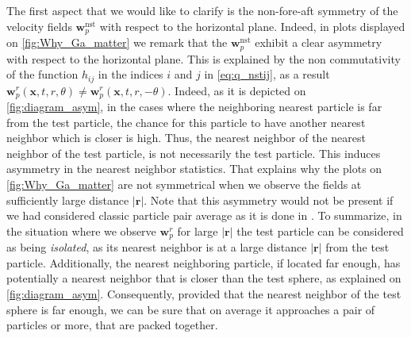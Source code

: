 The first aspect that we would like to clarify is the non-fore-aft symmetry of the velocity fields $\textbf{w}_p^\text{nst}$ with respect to the horizontal plane. 
Indeed, in plots displayed on \ref{fig:Why_Ga_matter} we remark that the $\textbf{w}_p^\text{nst}$ exhibit a clear asymmetry with respect to the horizontal plane.
This is explained by the non commutativity of the function $h_{ij}$ in the indices $i$ and $j$ in \ref{eq:q_nstij}, as a result $\textbf{w}_p^r(\textbf{x},t,r,\theta) \neq \textbf{w}_p^r(\textbf{x},t,r,-\theta)$. 
Indeed, as it is depicted on \ref{fig:diagram_asym}, in the cases where the neighboring nearest particle is far from the test particle, the chance for this particle to have another nearest neighbor which is closer is high. 
Thus, the nearest neighbor of the nearest neighbor of the test particle, is not necessarily the test particle. 
This induces asymmetry in the nearest neighbor statistics. 
That explains why the plots on \ref{fig:Why_Ga_matter} are not symmetrical when we observe the fields at sufficiently large distance $|\textbf{r}|$. 
Note that this asymmetry would not be present if we had considered classic particle pair average as it is done in \cite{shajahan2023inertial}. 
To summarize, in the situation where we observe $\textbf{w}_p^r$ for large $|\textbf{r}|$ the test particle can be considered as being \textit{isolated}, as its nearest neighbor is at a large distance $|\textbf{r}|$ from the test particle. 
Additionally, the nearest neighboring particle, if located far enough, has 
potentially a nearest neighbor that is closer than the test sphere, as explained on \ref{fig:diagram_asym}. 
Consequently, provided that the nearest neighbor of the test sphere is far enough, we can be sure that on average it approaches a pair of particles or more, that are packed together. 

